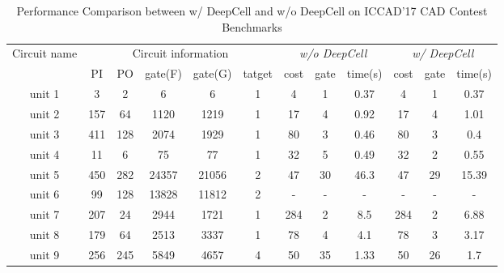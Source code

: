 \begin{table*}[!t]
  \centering
  \caption{Performance Comparison between w/ DeepCell and w/o DeepCell on ICCAD’17 CAD Contest Benchmarks}
  \vspace{-5pt}
    \linewidth
    \begin{tabular}{cccccc|ccc|ccc}
    \toprule
    \multirow{2}[2]{*}{Circuit name} & \multicolumn{5}{c}{Circuit information} & \multicolumn{3}{c}{\textit{w/o DeepCell}} & \multicolumn{3}{c}{\textit{w/ DeepCell}} \\
          & \multicolumn{1}{c}{PI} & \multicolumn{1}{c}{PO} & \multicolumn{1}{c}{gate(F)} & \multicolumn{1}{c}{gate(G)} & tatget & cost  & gate  & time(s) & cost  & gate  & time(s) \\
    \midrule
    unit 1 & \multicolumn{1}{c}{3} & \multicolumn{1}{c}{2} & \multicolumn{1}{c}{6} & \multicolumn{1}{c}{6} & 1 & 4     & 1     & 0.37  & 4     & 1     & 0.37 \\
    unit 2 & \multicolumn{1}{c}{157} & \multicolumn{1}{c}{64} & \multicolumn{1}{c}{1120} & \multicolumn{1}{c}{1219} & 1 & 17    & 4     & 0.92  & 17    & 4     & 1.01 \\
    unit 3 & \multicolumn{1}{c}{411} & \multicolumn{1}{c}{128} & \multicolumn{1}{c}{2074} & \multicolumn{1}{c}{1929} & 1 & 80    & 3     & 0.46  & 80    & 3     & 0.4 \\
    unit 4 & \multicolumn{1}{c}{11} & \multicolumn{1}{c}{6} & \multicolumn{1}{c}{75} & \multicolumn{1}{c}{77} & 1 & 32    & 5     & 0.49  & 32    & 2     & 0.55 \\
    unit 5 & \multicolumn{1}{c}{450} & \multicolumn{1}{c}{282} & \multicolumn{1}{c}{24357} & \multicolumn{1}{c}{21056} & 2 & 47    & 30    & 46.3  & 47    & 29    & 15.39 \\
    unit 6 & \multicolumn{1}{c}{99} & \multicolumn{1}{c}{128} & \multicolumn{1}{c}{13828} & \multicolumn{1}{c}{11812} & 2 & -     & -     & -     & -     & -     & - \\
    unit 7 & \multicolumn{1}{c}{207} & \multicolumn{1}{c}{24} & \multicolumn{1}{c}{2944} & \multicolumn{1}{c}{1721} & 1 & 284   & 2     & 8.5   & 284   & 2     & 6.88 \\
    unit 8 & \multicolumn{1}{c}{179} & \multicolumn{1}{c}{64} & \multicolumn{1}{c}{2513} & \multicolumn{1}{c}{3337} & 1 & 78    & 4     & 4.1   & 78    & 3     & 3.17 \\
    unit 9 & \multicolumn{1}{c}{256} & \multicolumn{1}{c}{245} & \multicolumn{1}{c}{5849} & \multicolumn{1}{c}{4657} & 4 & 50    & 35    & 1.33  & 50    & 26    & 1.7 \\

\end{tabular}
\end{table*}
